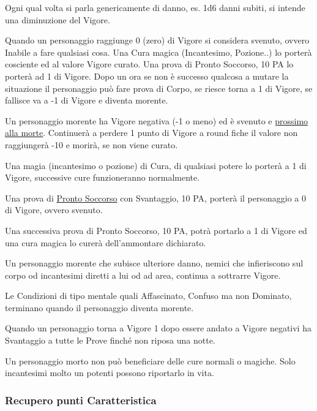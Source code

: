 \documentclass[12pt,a4paper,twoside,openany]{book}
\begin{document}
\begin{multicols}{2}

Ogni qual volta si parla genericamente di danno, es. 1d6 danni subiti, si intende una diminuzione del Vigore.

Quando un personaggio raggiunge 0 (zero) di Vigore si considera svenuto, ovvero Inabile a fare qualsiasi cosa. Una Cura magica (Incantesimo, Pozione..) lo porterà cosciente ed al valore Vigore curato. Una prova di Pronto Soccorso, 10 PA lo porterà ad 1 di Vigore. Dopo un ora se non è successo qualcosa a mutare la situazione il personaggio può fare prova di Corpo, se riesce torna a 1 di Vigore, se fallisce va a -1 di Vigore e diventa morente.

Un personaggio morente ha Vigore negativa (-1 o meno) ed è svenuto e \hyperlink{morente}{prossimo alla morte}. Continuerà a perdere 1 punto di Vigore a round fiche il valore non raggiungerà -10 e morirà, se non viene curato.

Una magia (incantesimo o pozione) di Cura, di qualsiasi potere lo porterà a 1 di Vigore, successive cure funzioneranno normalmente.

Una prova di \hyperlink{prontosoccorso}{Pronto Soccorso} con Svantaggio, 10 PA, porterà il personaggio a 0 di Vigore, ovvero svenuto. 

Una successiva prova di Pronto Soccorso, 10 PA, potrà portarlo a 1 di Vigore ed una cura magica lo curerà dell'ammontare dichiarato.

Un personaggio morente che subisce ulteriore danno, nemici che infieriscono sul corpo od incantesimi diretti a lui od ad area, continua a sottrarre Vigore. 

Le Condizioni di tipo mentale quali Affascinato, Confuso ma non Dominato, terminano quando il personaggio diventa morente.

Quando un personaggio torna a Vigore 1 dopo essere andato a Vigore negativi ha Svantaggio a tutte le Prove finché non riposa una notte.

Un personaggio morto non può beneficiare delle cure normali o magiche. Solo incantesimi molto un potenti possono riportarlo in vita.

\subsubsection{Recupero punti Caratteristica}\label{recuperopunticcaratteristica}


\end{multicols}
\end{document}
